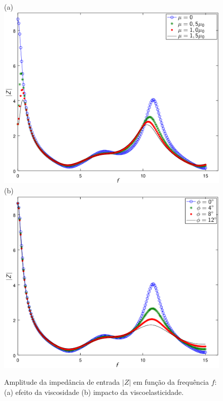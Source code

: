 \documentclass[
        english,			
        brazil			        %
        ,<...>]{abntbibufjf}
\begin{document}
\begin{figure}[!htbp]
	\centering
	(a) \\
	\includegraphics[scale=0.7]{figure-result-impedance/fig_viscosity_impedance_new.png}\\
		(b) \\
	\includegraphics[scale=0.7]{figure-result-impedance/fig_viscoelasticity_impedance_new.png}
	\caption{Amplitude da impedância de entrada $|Z|$ em função da frequência $f$: (a) efeito da viscosidade (b) impacto da viscoelasticidade.}
	\label{fig:impedance1}%
\end{figure}
\end{document}
